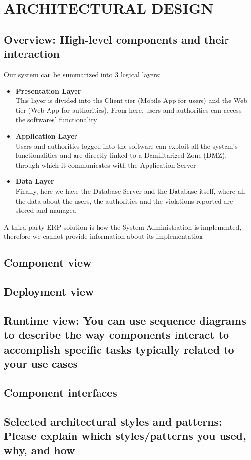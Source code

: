 \documentclass[12pt,a4paper]{article}
\begin{document}
\section{ARCHITECTURAL DESIGN}
\subsection{Overview: High-level components and their interaction}
Our system can be summarized into 3 logical layers:
\begin{itemize}
\item \textbf{Presentation Layer}\\
This layer is divided into the Client tier (Mobile App for users) and the Web tier (Web App for authorities). From here, users and authorities can access the softwares' functionality 
\item \textbf{Application Layer}\\
Users and authorities logged into the software can exploit all the system's functionalities and are directly linked to a Demilitarized Zone (DMZ), through which it communicates with the Application Server
\item \textbf{Data Layer}\\
Finally, here we have the Database Server and the Database itself, where all the data about the users, the authorities and the violations reported are stored and managed
\end{itemize}
A third-party ERP solution is how the System Administration is implemented, therefore we cannot provide information about its implementation
\subsection{Component view}
\subsection{Deployment view}
\subsection{Runtime view: You can use sequence diagrams to describe the way components interact to accomplish specific tasks typically related to your use cases}
\subsection{Component interfaces}
\subsection{Selected architectural styles and patterns: Please explain which styles/patterns you used, why, and how}
\end{document}
